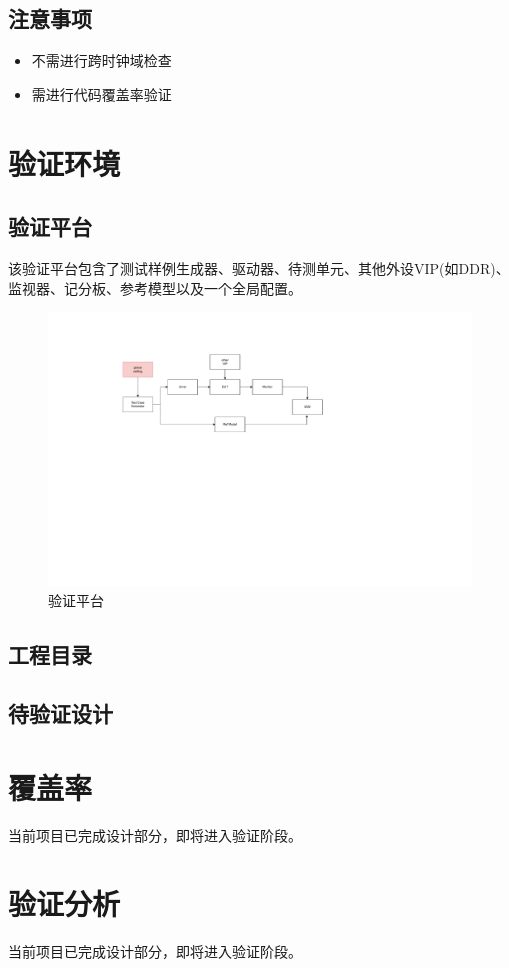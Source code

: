 \documentclass[12pt, a4paper, oneside]{ctexbook}
\begin{document}
		\section{注意事项}
		\begin{itemize}
			\item 不需进行跨时钟域检查
			\item 需进行代码覆盖率验证	
		\end{itemize}		
		
		
	\chapter{验证环境}
		\section{验证平台}
		该验证平台包含了测试样例生成器、驱动器、待测单元、其他外设VIP(如DDR)、监视器、记分板、参考模型以及一个全局配置。	
		\begin{figure}[h]
			\centering
			\includegraphics[scale=0.7]{pic/testbench}
			\caption{验证平台}
			\label{fig:testbench}
		\end{figure}
		
		\section{工程目录}
		
		\section{待验证设计}
	\chapter{覆盖率}
	当前项目已完成设计部分，即将进入验证阶段。	
	\chapter{验证分析}
	当前项目已完成设计部分，即将进入验证阶段。
\end{document}
